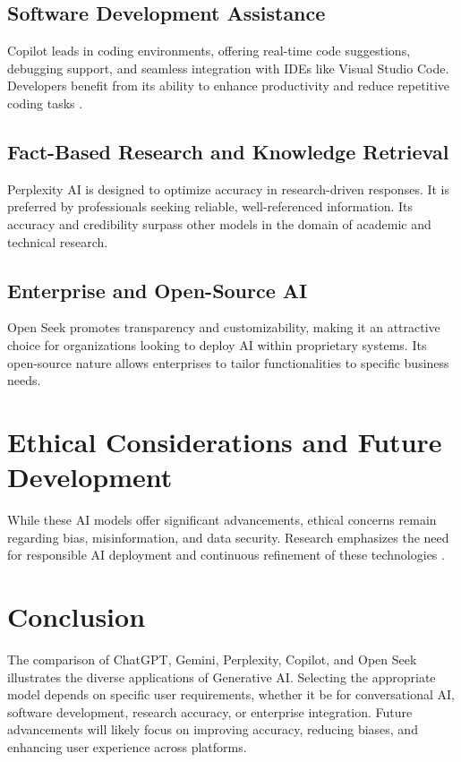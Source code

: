 \documentclass[a4paper,headinclude=on,footinclude=on,12pt,oneside]{scrbook}
\begin{document}
\subsection{Software Development Assistance}

Copilot leads in coding environments, offering real-time code suggestions, debugging support, and seamless integration with IDEs like Visual Studio Code. Developers benefit from its ability to enhance productivity and reduce repetitive coding tasks \cite{ChatGPTCopilotVisual}.

\subsection{Fact-Based Research and Knowledge Retrieval}

Perplexity AI is designed to optimize accuracy in research-driven responses. It is preferred by professionals seeking reliable, well-referenced information. Its accuracy and credibility surpass other models in the domain of academic and technical research.

\subsection{Enterprise and Open-Source AI}

Open Seek promotes transparency and customizability, making it an attractive choice for organizations looking to deploy AI within proprietary systems. Its open-source nature allows enterprises to tailor functionalities to specific business needs.

\section{Ethical Considerations and Future Development}

While these AI models offer significant advancements, ethical concerns remain regarding bias, misinformation, and data security. Research emphasizes the need for responsible AI deployment and continuous refinement of these technologies \cite{GenerativeArtificialIntelligence}.

\section{Conclusion}

The comparison of ChatGPT, Gemini, Perplexity, Copilot, and Open Seek illustrates the diverse applications of Generative AI. Selecting the appropriate model depends on specific user requirements, whether it be for conversational AI, software development, research accuracy, or enterprise integration. Future advancements will likely focus on improving accuracy, reducing biases, and enhancing user experience across platforms.
\end{document}
